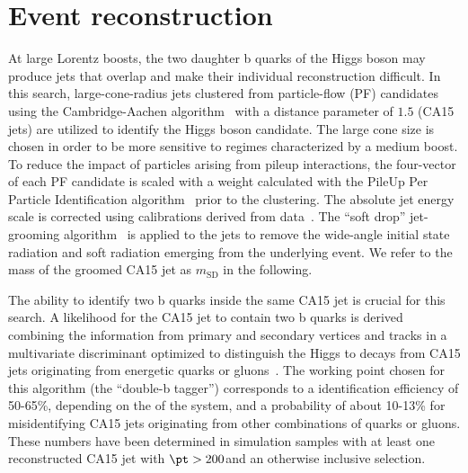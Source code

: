 


\section{Event reconstruction}

At large Lorentz boosts, the two daughter b quarks of the Higgs boson may produce jets that overlap and make their individual reconstruction difficult. In this search, large-cone-radius jets clustered from particle-flow (PF) \cite{Sirunyan:2017ulk} candidates using the Cambridge-Aachen algorithm~\cite{cajets} with a distance parameter of $1.5$ (CA15 jets) are utilized to identify the Higgs boson candidate.  The large cone size is chosen in order to be more sensitive to regimes characterized by a medium boost.
To reduce the impact of particles arising from pileup interactions,  the four-vector of each PF candidate is scaled with a weight calculated with the PileUp Per Particle Identification algorithm~\cite{puppi} prior to the clustering.
The absolute jet energy scale is corrected using calibrations derived from data~\cite{jec}.
The ``soft drop'' jet-grooming algorithm~\cite{msd} is applied to the jets to remove the wide-angle initial state radiation and soft radiation emerging from the underlying event. We refer to the mass of the groomed CA15 jet as $m_\text{SD}$ in the following. 

The ability to identify two b quarks inside the same CA15 jet is crucial for this search. A likelihood for the CA15 jet to contain two b quarks is derived combining the information from primary and secondary vertices and tracks in a multivariate discriminant optimized to distinguish the Higgs to \bb decays from CA15 jets originating from energetic quarks or gluons~\cite{doubleb}.
The working point chosen for this algorithm (the ``double-b tagger'') corresponds to a \bb identification efficiency of 50-65\%, depending on the \pt of the \bb system, and a probability of about 10-13\% for misidentifying CA15 jets originating from other combinations of quarks or gluons. These numbers have been determined in simulation samples with at least one reconstructed CA15 jet with $\pt>200$\GeV and an otherwise inclusive selection. 

